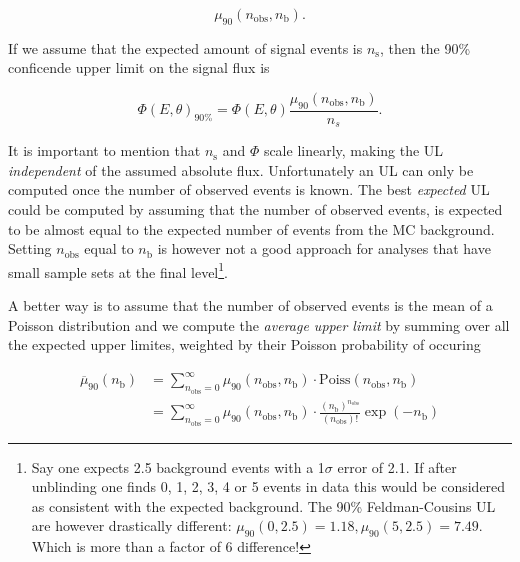 \begin{equation}
\mu_{90} \left(n_\textrm{obs},n_\textrm{b}\right).
\end{equation}

\noindent If we assume that the expected amount of signal events is $n_\textrm{s}$, then the 90\% conficende upper limit on the signal flux is

\begin{equation}
\label{eq:flux}
\Phi\left(E,\theta\right)_{90\%} = \Phi\left(E,\theta\right) \frac{\mu_{90}\left(n_\textrm{obs},n_\textrm{b}\right)}{n_s}.
\end{equation}

\noindent It is important to mention that $n_\textrm{s}$ and $\Phi$ scale linearly, making the UL \textit{independent} of the assumed absolute flux. Unfortunately  an UL can only be computed once the number of observed events is known. The best \textit{expected} UL could be computed by assuming that the number of observed events, is expected to be almost equal to the expected number of events from the MC background. Setting $n_\textrm{obs}$ equal to $n_\textrm{b}$ is however not a good approach for analyses that have small sample sets at the final level\footnote{Say one expects 2.5 background events with a 1$\sigma$ error of 2.1. If after unblinding one finds 0, 1, 2, 3, 4 or 5 events in data this would be considered as consistent with the expected background. The 90\% Feldman-Cousins UL are however drastically different: $\mu_{90}(0,2.5) = 1.18, \mu_{90}(5,2.5) = 7.49$. Which is more than a factor of 6 difference!}.

A better way is to assume that the number of observed events is the mean of a Poisson distribution and we compute the \textit{average upper limit} by summing over all the expected upper limites, weighted by their Poisson probability of occuring \cite{Hill:2002nv}

\begin{equation}
\begin{split}
\overline{\mu}_{90}(n_\textrm{b}) &= \sum^{\infty}_{n_\textrm{obs}=0} \mu_{90}\left(n_\textrm{obs},n_\textrm{b}\right) \cdot \textrm{Poiss}\left(n_\textrm{obs},n_\textrm{b}\right)\\
&= \sum^{\infty}_{n_\textrm{obs}=0} \mu_{90}\left(n_\textrm{obs},n_\textrm{b}\right) \cdot \frac{\left(n_\textrm{b}\right)^{n_\textrm{obs}}}{\left(n_\textrm{obs}\right)!} \exp\left(-n_\textrm{b}\right)
\end{split}
\end{equation}

